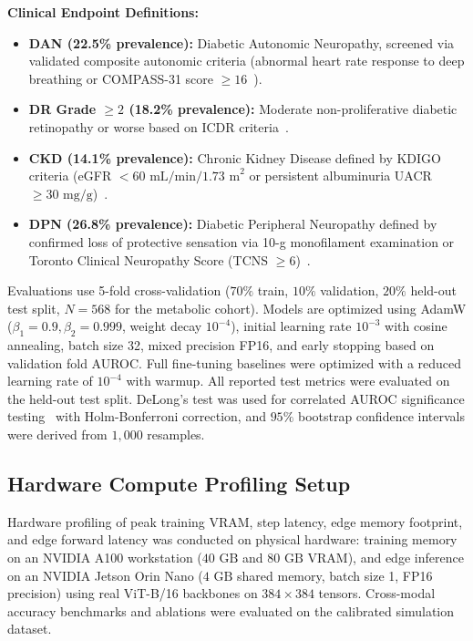 \documentclass[journal,10pt,twocolumn]{IEEEtran}
\begin{document}
\noindent\textbf{Clinical Endpoint Definitions:}
\begin{itemize}
    \item \textbf{DAN (22.5\% prevalence):} Diabetic Autonomic Neuropathy, screened via validated composite autonomic criteria (abnormal heart rate response to deep breathing or COMPASS-31 score $\ge 16$~\cite{sletten2012compass}).
    \item \textbf{DR Grade $\ge 2$ (18.2\% prevalence):} Moderate non-proliferative diabetic retinopathy or worse based on ICDR criteria~\cite{gulshan2016development}.
    \item \textbf{CKD (14.1\% prevalence):} Chronic Kidney Disease defined by KDIGO criteria (eGFR $< 60\text{ mL/min/1.73 m}^2$ or persistent albuminuria UACR $\ge 30\text{ mg/g}$)~\cite{kdigo2013ckd}.
    \item \textbf{DPN (26.8\% prevalence):} Diabetic Peripheral Neuropathy defined by confirmed loss of protective sensation via 10-g monofilament examination or Toronto Clinical Neuropathy Score (TCNS $\ge 6$)~\cite{bril2002toronto}.
\end{itemize}

Evaluations use 5-fold cross-validation ($70\%$ train, $10\%$ validation, $20\%$ held-out test split, $N=568$ for the metabolic cohort). Models are optimized using AdamW ($\beta_1=0.9, \beta_2=0.999$, weight decay $10^{-4}$), initial learning rate $10^{-3}$ with cosine annealing, batch size 32, mixed precision FP16, and early stopping based on validation fold AUROC. Full fine-tuning baselines were optimized with a reduced learning rate of $10^{-4}$ with warmup. All reported test metrics were evaluated on the held-out test split. DeLong's test was used for correlated AUROC significance testing~\cite{delong1988comparing} with Holm-Bonferroni correction, and $95\%$ bootstrap confidence intervals were derived from $1{,}000$ resamples.

\subsection{Hardware Compute Profiling Setup}
\label{sec:hardware_setup}
Hardware profiling of peak training VRAM, step latency, edge memory footprint, and edge forward latency was conducted on physical hardware: training memory on an NVIDIA A100 workstation ($40\text{ GB}$ and $80\text{ GB}$ VRAM), and edge inference on an NVIDIA Jetson Orin Nano ($4\text{ GB}$ shared memory, batch size 1, FP16 precision) using real ViT-B/16 backbones on $384 \times 384$ tensors. Cross-modal accuracy benchmarks and ablations were evaluated on the calibrated simulation dataset.
\end{document}
